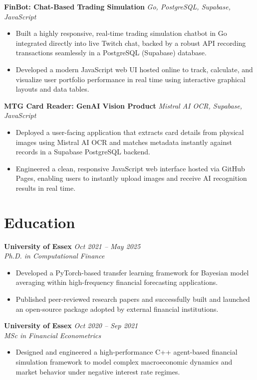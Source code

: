 \documentclass[11pt,a4paper]{article}
\begin{document}
\noindent \textbf{FinBot: Chat-Based Trading Simulation} \hfill \textit{Go, PostgreSQL, Supabase, JavaScript}
\begin{itemize}
    \item Built a highly responsive, real-time trading simulation chatbot in Go integrated directly into live Twitch chat, backed by a robust API recording transactions seamlessly in a PostgreSQL (Supabase) database.
    \item Developed a modern JavaScript web UI hosted online to track, calculate, and visualize user portfolio performance in real time using interactive graphical layouts and data tables.
\end{itemize}

\vspace{4pt}

\noindent \textbf{MTG Card Reader: GenAI Vision Product} \hfill \textit{Mistral AI OCR, Supabase, JavaScript}
\begin{itemize}
    \item Deployed a user-facing application that extracts card details from physical images using Mistral AI OCR and matches metadata instantly against records in a Supabase PostgreSQL backend.
    \item Engineered a clean, responsive JavaScript web interface hosted via GitHub Pages, enabling users to instantly upload images and receive AI recognition results in real time.
\end{itemize}

\section*{Education}

\noindent \textbf{University of Essex} \hfill \textit{Oct 2021 -- May 2025} \\
\textit{Ph.D. in Computational Finance}
\begin{itemize}
    \item Developed a PyTorch-based transfer learning framework for Bayesian model averaging within high-frequency financial forecasting applications.
    \item Published peer-reviewed research papers and successfully built and launched an open-source package adopted by external financial institutions.
\end{itemize}

\vspace{4pt}

\noindent \textbf{University of Essex} \hfill \textit{Oct 2020 -- Sep 2021} \\
\textit{MSc in Financial Econometrics}
\begin{itemize}
    \item Designed and engineered a high-performance C++ agent-based financial simulation framework to model complex macroeconomic dynamics and market behavior under negative interest rate regimes.
\end{itemize}
\end{document}
